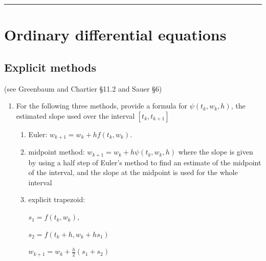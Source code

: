 \documentclass[12pt,letterpaper,noanswers]{exam}
\begin{document}
\vspace{0.2cm}
\hrule
\vspace{0.2cm}


\section*{Ordinary differential equations}
\subsection*{Explicit methods}
 (see Greenbaum and Chartier \S 11.2 and Sauer \S 6)





 

\begin{enumerate}
    \item For the following three methods, provide a formula for $\psi(t_k,w_k,h)$, the estimated slope used over the interval $[t_k,t_{k+1}]$
    \begin{enumerate}
    \item Euler: $w_{k+1} = w_k + hf(t_k,w_k)$.
    \vspace{1cm}
    \item midpoint method: $w_{k+1} = w_k + h\psi(t_k,w_k,h)$ where the slope is given by using a half step of Euler's method to find an estimate of the midpoint of the interval, and the slope at the midpoint is used for the whole interval
    \vspace{1.5in}
    \item explicit trapezoid:
    
    $s_1 = f(t_k,w_k)$, 
    
    $s_2 = f(t_k + h, w_k + hs_1)$
    
    $w_{k+1} = w_k + \frac{h}{2}(s_1 + s_2)$
    \vspace{1in}
    \end{enumerate}
\end{enumerate}
\end{document}
